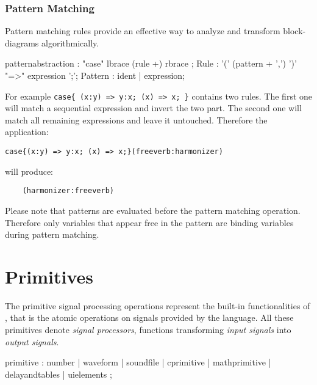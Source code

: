 \subsubsection{Pattern Matching}
Pattern matching rules provide an effective way to analyze and transform block-diagrams algorithmically.
\begin{rail}
patternabstraction :  "case" lbrace (rule +) rbrace ;
Rule : '(' (pattern + ',') ')' "=>" expression ';';
Pattern : ident | expression;
\end{rail}

For example \lstinline'case{ (x:y) => y:x; (x) => x; }' contains two rules. The first one will match a sequential expression and invert the two part. The second one will match all remaining expressions and leave it untouched. Therefore the application:

\begin{lstlisting}
case{(x:y) => y:x; (x) => x;}(freeverb:harmonizer)
\end{lstlisting}

will produce:

\begin{lstlisting}
	(harmonizer:freeverb)
\end{lstlisting}

Please note that patterns are evaluated before the pattern matching operation. Therefore only variables that appear free in the pattern are binding variables during pattern matching. 

\section{Primitives}
\label{primitives}
The primitive signal processing operations represent the built-in functionalities of \faust, that is the atomic operations on signals provided by the language. All these primitives denote \emph{signal processors}, functions transforming \emph{input signals} into \emph{output signals}.

  \begin{rail}
  primitive : number
  			| waveform
			| soundfile
			| cprimitive
			| mathprimitive
			| delayandtables
			| uielements
			;
  \end{rail}

